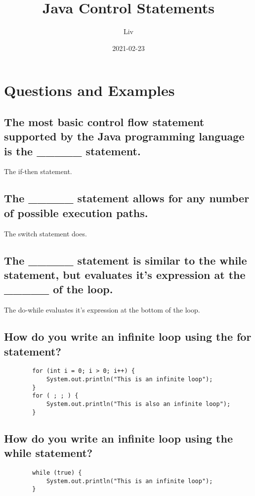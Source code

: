 \documentclass{article}
\title{Java Control Statements}
\date{2021-02-23}
\author{Liv}
\begin{document}
    \maketitle

    \section{Questions and Examples}

    \subsection{The most basic control flow statement supported by the Java programming language is the \_\_\_\_\_ statement.}
    The if-then statement.

    \subsection{The \_\_\_\_\_ statement allows for any number of possible execution paths.}
    The switch statement does.

    \subsection{The \_\_\_\_\_ statement is similar to the while statement, but evaluates it's expression at the \_\_\_\_\_ of the loop.}
    The do-while evaluates it's expression at the bottom of the loop.

    \subsection{How do you write an infinite loop using the for statement?}
    \begin{verbatim}
        for (int i = 0; i > 0; i++) {
            System.out.println("This is an infinite loop");
        }
        for ( ; ; ) {
            System.out.println("This is also an infinite loop");
        }
    \end{verbatim}

    \subsection{How do you write an infinite loop using the while statement?}
    \begin{verbatim}
        while (true) {
            System.out.println("This is an infinite loop");
        }
    \end{verbatim}
\end{document}
